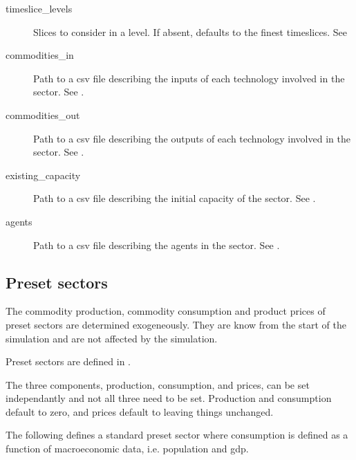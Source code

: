 \documentclass[letterpaper,10pt,english]{sphinxmanual}
\begin{document}
\begin{description}
\item[{timeslice\_levels}] \leavevmode
Slices to consider in a level. If absent, defaults to the finest timeslices.  See
{\hyperref[\detokenize{inputs/toml:timeslices}]{}}

\item[{commodities\_in}] \leavevmode
Path to a csv file describing the inputs of each technology involved in the sector.
See {\hyperref[\detokenize{inputs/commodities_io:inputs-iocomms}]{}}.

\item[{commodities\_out}] \leavevmode
Path to a csv file describing the outputs of each technology involved in the sector.
See {\hyperref[\detokenize{inputs/commodities_io:inputs-ocomms}]{}}.

\item[{existing\_capacity}] \leavevmode
Path to a csv file describing the initial capacity of the sector.
See {\hyperref[\detokenize{inputs/existing_capacity:inputs-existing-capacity}]{}}.

\item[{agents}] \leavevmode
Path to a csv file describing the agents in the sector.
See {\hyperref[\detokenize{inputs/agents:inputs-agents}]{}}.

\end{description}


\subsection{Preset sectors}
\label{\detokenize{inputs/toml:preset-sectors}}
The commodity production, commodity consumption and product prices of preset sectors are determined
exogeneously. They are know from the start of the simulation and are not affected by the
simulation.

Preset sectors are defined in .

The three components, production, consumption, and prices, can be set independantly and
not all three need to be set. Production and consumption default to zero, and prices
default to leaving things unchanged.

The following defines a standard preset sector where consumption is defined as a
function of macro\sphinxhyphen{}economic data, i.e. population and gdp.
\end{document}
